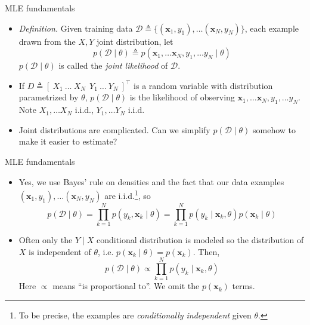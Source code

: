 \documentclass{beamer}
\numberwithin{equation}{section}
\begin{document}
\begin{frame}{MLE fundamentals}
    \begin{itemize}
        \item
        \textit{Definition.} Given training data $ \mathcal{D} \triangleq
        \{(\mathbf{x}_1, y_1), \ldots (\mathbf{x}_N, y_N)\} $, each example
        drawn from the $ X, Y $ joint distribution, let
        \begin{equation*}
            p(\mathcal{D} \mid \theta) \triangleq p(\mathbf{x}_1, \ldots
                \mathbf{x}_N, y_1, \ldots y_N \mid \theta)
        \end{equation*}
        $ p(\mathcal{D} \mid \theta) $ is called the
        \textit{joint likelihood} of $ \mathcal{D} $.

        \item
        If $ D \triangleq [ \ X_1 \ \ldots \ X_N \ \ Y_1 \ \ldots
        \ Y_N \ ]^\top $ is a random variable with distribution
        parametrized by $ \theta $, $ p(\mathcal{D} \mid \theta) $ is the
        likelihood of observing $ \mathbf{x}_1, \ldots \mathbf{x}_N, y_1,
        \ldots y_N $. Note $ X_1, \ldots X_N $ i.i.d.,
        $ Y_1, \ldots Y_N $ i.i.d.

        \item
        Joint distributions are complicated. Can we simplify
        $ p(\mathcal{D} \mid \theta) $ somehow to make it easier to estimate?
    \end{itemize}
\end{frame}

\begin{frame}{MLE fundamentals}
    \begin{itemize}
        \item
        Yes, we use Bayes' rule on densities and the fact that our data
        examples $ (\mathbf{x}_1, y_1), \ldots (\mathbf{x}_N, y_N) $ are
        i.i.d.\footnote{
            To be precise, the examples are \textit{conditionally independent}
            given $ \theta $.
        }, so
        \begin{equation*}
            p(\mathcal{D} \mid \theta) =
            \prod_{k = 1}^N p(y_k, \mathbf{x}_k \mid \theta) =
            \prod_{k = 1}^N p(y_k \mid \mathbf{x}_k, \theta)
                p(\mathbf{x}_k \mid \theta)
        \end{equation*}

        \item
        Often only the $ Y \mid X $ conditional distribution is modeled so the
        distribution of $ X $ is independent of $ \theta $, i.e.
        $ p(\mathbf{x}_k \mid \theta) = p(\mathbf{x}_k) $. Then,
        \begin{equation} \label{cond_likelihood}
            p(\mathcal{D} \mid \theta) \propto
            \prod_{k = 1}^N p(y_k \mid \mathbf{x}_k, \theta)
        \end{equation}
        Here $ \propto $ means ``is proportional to''. We omit the
        $ p(\mathbf{x}_k) $ terms.
    \end{itemize}
\end{frame}
\end{document}
